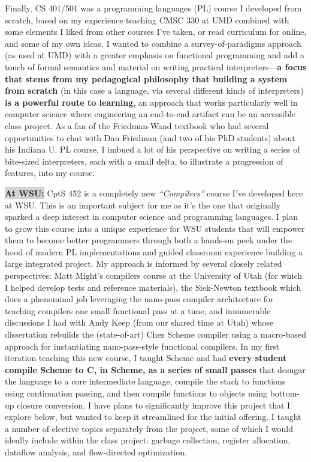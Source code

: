 \documentclass[12pt]{article}
\begin{document}
Finally, CS 401/501 was a programming languages (PL) course I developed from scratch, based on my experience teaching CMSC 330 at UMD combined with some elements I liked from other courses I've taken, or read curriculum for online, and some of my own ideas. I wanted to combine a survey-of-paradigms approach (as used at UMD) with a greater emphasis on functional programming and add a touch of formal semantics and material on writing practical interpreters---\textbf{a focus that stems from my pedagogical philosophy that building a system from scratch} (in this case a language, via several different kinds of interpreters) \textbf{is a powerful route to learning}, an approach that works particularly well in computer science where engineering an end-to-end artifact can be an accessible class project. As a fan of the Friedman-Wand textbook who had several opportunities to chat with Dan Friedman (and two of his PhD students) about his Indiana U. PL course, I imbued a lot of his perspective on writing a series of bite-sized interpreters, each with a small delta, to illustrate a progression of features, into my course.

\colorbox{lightgray}{\textbf{At WSU:}} CptS 452 is a completely new \emph{``Compilers''} course I've developed here at WSU. This is an important subject for me as it's the one that originally sparked a deep interest in computer science and programming languages. I plan to grow this course into a unique experience for WSU students that will empower them to become better programmers through both a hands-on peek under the hood of modern PL implementations and guided classroom experience building a large integrated project. My approach is informed by several closely related perspectives: Matt Might's compilers course at the University of Utah (for which I helped develop tests and reference materials), the Siek-Newton textbook which does a phenominal job leveraging the nano-pass compiler architecture for teaching compilers one small functional pass at a time, and innumerable discussions I had with Andy Keep (from our shared time at Utah) whose dissertation rebuilds the (state-of-art) Chez Scheme compiler using a macro-based approach for instantiating nano-pass-style functional compilers. In my first iteration teaching this new course, I taught Scheme and had \textbf{every student compile Scheme to C, in Scheme, as a series of small passes} that desugar the language to a core intermediate language, compile the stack to functions using continuation passing, and then compile functions to objects using bottom-up closure conversion. I have plans to significantly improve this project that I explore below, but wanted to keep it streamlined for the initial offering. I taught a number of elective topics separately from the project, some of which I would ideally include within the class project: garbage collection, register allocation, dataflow analysis, and flow-directed optimization.
\end{document}
